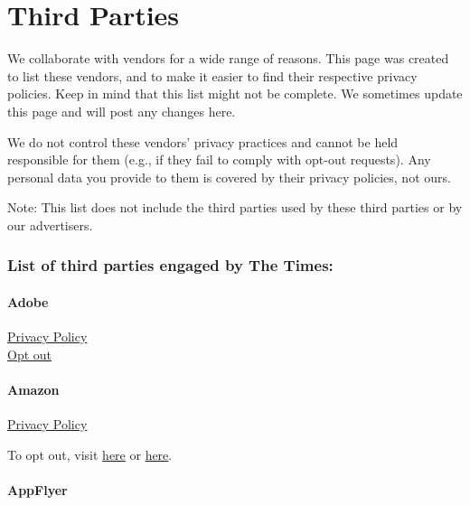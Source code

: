 \hypertarget{third-parties}{%
\section{Third Parties}\label{third-parties}}

We collaborate with vendors for a wide range of reasons. This page was
created to list these vendors, and to make it easier to find their
respective privacy policies. Keep in mind that this list might not be
complete. We sometimes update this page and will post any changes here.

We do not control these vendors' privacy practices and cannot be held
responsible for them (e.g., if they fail to comply with opt-out
requests). Any personal data you provide to them is covered by their
privacy policies, not ours.

Note: This list does not include the third parties used by these third
parties or by our advertisers.

\hypertarget{list-of-third-parties-engaged-by-the-times}{%
\subsubsection{List of third parties engaged by The
Times:}\label{list-of-third-parties-engaged-by-the-times}}

\hypertarget{adobe}{%
\paragraph{Adobe}\label{adobe}}

\href{https://www.adobe.com/privacy/policy.html}{Privacy Policy}\\
\href{https://www.adobe.com/privacy/opt-out.html}{Opt out}

\hypertarget{amazon}{%
\paragraph{Amazon}\label{amazon}}

\href{https://www.amazon.com/gp/help/customer/display.html/?ie=UTF8\&nodeId=468496\&ref=a20m_us_fnav_prvcy}{Privacy
Policy}

To opt out, visit \href{https://www.amazon.co.uk/adprefs}{here} or
\href{http://www.youronlinechoices.com/}{here}.

\hypertarget{appflyer}{%
\paragraph{AppFlyer}\label{appflyer}}

